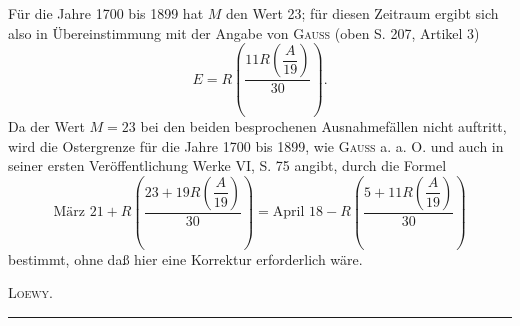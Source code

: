 Für die Jahre 1700 bis 1899 hat $M$ den Wert 23; für diesen Zeitraum ergibt sich also in Übereinstimmung mit der Angabe von \textsc{Gauss} (oben S. 207, Artikel 3)
\[
E=R\left(\frac{11R\left(\dfrac A{19}\right)}{30}\right).
\]
\noindent Da der Wert $M=23$ bei den beiden besprochenen Ausnahmefällen nicht auftritt, wird die Ostergrenze für die Jahre 1700 bis 1899, wie \textsc{Gauss} a. a. O. und auch in seiner ersten Veröffentlichung Werke VI, S. 75 angibt, durch die Formel
\[
\text{März }21+R\left(\frac{23+19R\left(\dfrac A{19}\right)}{30}\right)=\text{April }18-R\left(\frac{5+11R\left(\dfrac A{19}\right)}{30}\right)
\]
\noindent bestimmt, ohne daß hier eine Korrektur erforderlich wäre.
\begin{flushright}\textsc{Loewy.}\end{flushright}
{\normalsize \begin{center}\rule{.24\textwidth}{.35pt}\end{center}}
\clearpage\endgroup\endgroup
